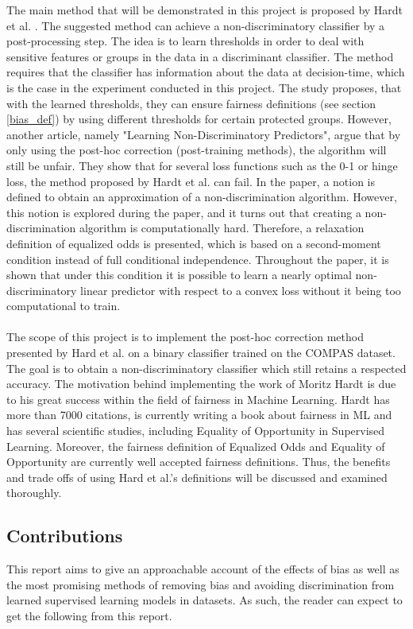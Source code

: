 \documentclass[11pt, fleqn, titlepage]{article}
\begin{document}
	\noindent The main method that will be demonstrated in this project is proposed by Hardt et al. \cite{equal_of_oppor}. The suggested method can achieve a non-discriminatory classifier by a post-processing step. The idea is to learn thresholds in order to deal with sensitive features or groups in the data in a discriminant classifier. The method requires that the classifier has information about the data at decision-time, which is the case in the experiment conducted in this project. The study proposes, that with the learned thresholds, they can ensure fairness definitions (see section \ref{bias_def}) by using different thresholds for certain protected groups. However, another article, namely "Learning Non-Discriminatory Predictors", argue that by only using the post-hoc correction (post-training methods), the algorithm will still be unfair. \cite{b_woodworth} They show that for several loss functions such as the 0-1 or hinge loss, the method proposed by Hardt et al. \cite{equal_of_oppor} can fail. In the paper, a notion is defined to obtain an approximation of a non-discrimination algorithm. However, this notion is explored during the paper, and it turns out that creating a non-discrimination algorithm is computationally hard. Therefore, a relaxation definition of equalized odds is presented, which is based on a second-moment condition instead of full conditional independence. Throughout the paper, it is shown that under this condition it is possible to learn a nearly optimal non-discriminatory linear predictor with respect to a convex loss without it being too computational to train. \cite{b_woodworth}\\\\
	The scope of this project is to implement the post-hoc correction method presented by Hard et al. \cite{equal_of_oppor} on a binary classifier trained on the COMPAS dataset. The goal is to obtain a non-discriminatory classifier which still retains a respected accuracy. The motivation behind implementing the work of Moritz Hardt is due to his great success within the field of fairness in Machine Learning. Hardt has more than 7000 citations, is currently writing a book about fairness in ML and has several scientific studies, including Equality of Opportunity in Supervised Learning. Moreover, the fairness definition of Equalized Odds and Equality of Opportunity are currently well accepted fairness definitions. Thus, the benefits and trade offs of using Hard et al.'s definitions will be discussed and examined thoroughly.
	
	\subsection{Contributions}
	This report aims to give an approachable account of the effects of bias as well as the most promising methods of removing bias and avoiding discrimination from learned supervised learning models in datasets. As such, the reader can expect to get the following from this report.
	
\end{document}
